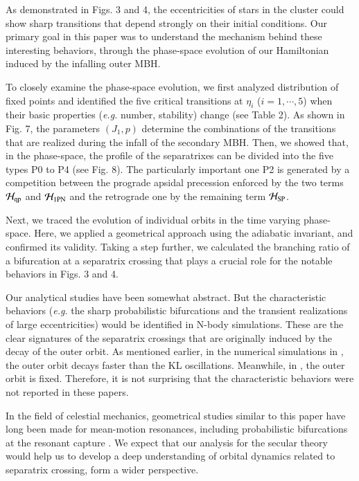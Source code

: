 \documentclass[useAMS,usenatbib,twocolumn]{mn2e}
\begin{document}
As demonstrated in Figs. 3 and 4, 
the eccentricities of  stars in the cluster could show  sharp transitions that depend strongly on their initial conditions. Our primary goal in this paper was to understand the mechanism behind these interesting behaviors, through the phase-space evolution of our Hamiltonian induced by the infalling outer MBH.    


To closely examine the phase-space evolution, we first analyzed distribution of fixed points and identified the five critical transitions at  $\eta_i$ ($i=1,\cdots,5$) when their basic properties ({\it e.g.} number, stability) change (see Table 2).   As shown in Fig. 7, the  parameters $(J_1,p)$ determine the combinations of the transitions that are realized during the infall of the secondary MBH. 
Then, we showed that, in the phase-space,  the profile of the separatrixes can be divided into the five types P0 to P4 (see Fig. 8).  The particularly important one P2 is generated by a competition between the prograde apsidal precession enforced by the two terms $\mathcal{H}_{\rm qp}$ and $\mathcal{H}_{\rm 1PN}$ and the retrograde one by the remaining term $\mathcal{H}_{\rm SP}$.


Next, we traced the evolution of individual orbits in the time varying phase-space. Here, we applied a geometrical approach using the adiabatic invariant, and confirmed its validity. Taking a step further, we calculated the branching ratio of a bifurcation at a separatrix crossing that plays a crucial role for the notable behaviors in Figs. 3 and 4.  

 Our analytical studies have been somewhat abstract. But the characteristic behaviors  ({\it e.g.} the sharp probabilistic bifurcations  and the transient realizations of large eccentricities) would be identified in N-body simulations. These are the clear  signatures of the separatrix crossings that are originally induced by the decay of the outer orbit.  As mentioned earlier, in the numerical simulations in \cite{bode2014}, the outer orbit decays faster than the KL oscillations. Meanwhile, in  \cite{li2014}, the outer orbit is fixed. Therefore, it is not surprising that the characteristic behaviors  were not reported in these papers. 



In the field of celestial mechanics, geometrical studies similar to this paper have long been made for mean-motion resonances,  including probabilistic bifurcations at the resonant capture \citep{ssd}.  We expect that our analysis for the  secular theory would help us to develop a deep understanding of orbital dynamics related to separatrix crossing, form a wider perspective. 
\end{document}
